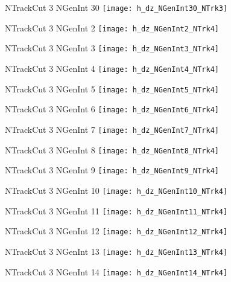 \documentclass[8pt]{beamer}
\begin{document}
\begin{frame}
\center
\large{NTrackCut 3 NGenInt 30}
\texttt{[image: h\_dz\_NGenInt30\_NTrk3]}
\end{frame}
\begin{frame}
\center
\large{NTrackCut 3 NGenInt 2}
\texttt{[image: h\_dz\_NGenInt2\_NTrk4]}
\end{frame}
\begin{frame}
\center
\large{NTrackCut 3 NGenInt 3}
\texttt{[image: h\_dz\_NGenInt3\_NTrk4]}
\end{frame}
\begin{frame}
\center
\large{NTrackCut 3 NGenInt 4}
\texttt{[image: h\_dz\_NGenInt4\_NTrk4]}
\end{frame}
\begin{frame}
\center
\large{NTrackCut 3 NGenInt 5}
\texttt{[image: h\_dz\_NGenInt5\_NTrk4]}
\end{frame}
\begin{frame}
\center
\large{NTrackCut 3 NGenInt 6}
\texttt{[image: h\_dz\_NGenInt6\_NTrk4]}
\end{frame}
\begin{frame}
\center
\large{NTrackCut 3 NGenInt 7}
\texttt{[image: h\_dz\_NGenInt7\_NTrk4]}
\end{frame}
\begin{frame}
\center
\large{NTrackCut 3 NGenInt 8}
\texttt{[image: h\_dz\_NGenInt8\_NTrk4]}
\end{frame}
\begin{frame}
\center
\large{NTrackCut 3 NGenInt 9}
\texttt{[image: h\_dz\_NGenInt9\_NTrk4]}
\end{frame}
\begin{frame}
\center
\large{NTrackCut 3 NGenInt 10}
\texttt{[image: h\_dz\_NGenInt10\_NTrk4]}
\end{frame}
\begin{frame}
\center
\large{NTrackCut 3 NGenInt 11}
\texttt{[image: h\_dz\_NGenInt11\_NTrk4]}
\end{frame}
\begin{frame}
\center
\large{NTrackCut 3 NGenInt 12}
\texttt{[image: h\_dz\_NGenInt12\_NTrk4]}
\end{frame}
\begin{frame}
\center
\large{NTrackCut 3 NGenInt 13}
\texttt{[image: h\_dz\_NGenInt13\_NTrk4]}
\end{frame}
\begin{frame}
\center
\large{NTrackCut 3 NGenInt 14}
\texttt{[image: h\_dz\_NGenInt14\_NTrk4]}
\end{frame}
\end{document}
